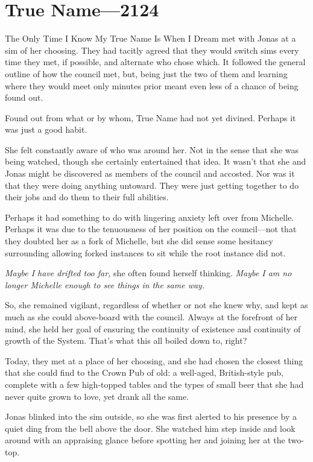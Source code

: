 \hypertarget{true-name-2124}{%
\chapter{True Name—2124}\label{true-name-2124}}

The Only Time I Know My True Name Is When I Dream met with Jonas at a sim of her choosing. They had tacitly agreed that they would switch sims every time they met, if possible, and alternate who chose which. It followed the general outline of how the council met, but, being just the two of them and learning where they would meet only minutes prior meant even less of a chance of being found out.

Found out from what or by whom, True Name had not yet divined. Perhaps it was just a good habit.

She felt constantly aware of who was around her. Not in the sense that she was being watched, though she certainly entertained that idea. It wasn't that she and Jonas might be discovered as members of the council and accosted. Nor was it that they were doing anything untoward. They were just getting together to do their jobs and do them to their full abilities.

Perhaps it had something to do with lingering anxiety left over from Michelle. Perhaps it was due to the tenuousness of her position on the council---not that they doubted her as a fork of Michelle, but she did sense some hesitancy surrounding allowing forked instances to sit while the root instance did not.

\emph{Maybe I have drifted too far,} she often found herself thinking. \emph{Maybe I am no longer Michelle enough to see things in the same way.}

So, she remained vigilant, regardless of whether or not she knew why, and kept as much as she could above-board with the council. Always at the forefront of her mind, she held her goal of ensuring the continuity of existence and continuity of growth of the System. That's what this all boiled down to, right?

Today, they met at a place of her choosing, and she had chosen the closest thing that she could find to the Crown Pub of old: a well-aged, British-style pub, complete with a few high-topped tables and the types of small beer that she had never quite grown to love, yet drank all the same.

Jonas blinked into the sim outside, so she was first alerted to his presence by a quiet ding from the bell above the door. She watched him step inside and look around with an appraising glance before spotting her and joining her at the two-top.

